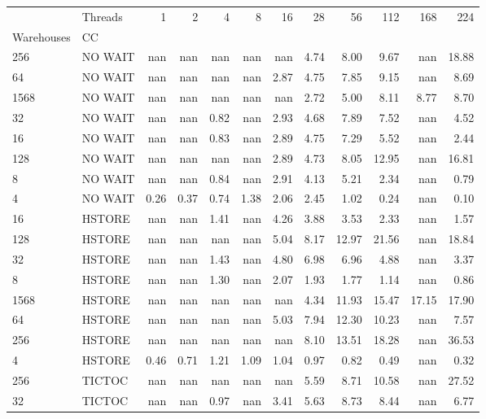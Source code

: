 \begin{tabular}{llrrrrrrrrrr}
\toprule
     & Threads &  1   &  2   &  4   &  8   &  16  &  28  &   56  &   112 &   168 &   224 \\
Warehouses & CC &      &      &      &      &      &      &       &       &       &       \\
\midrule
256  & NO WAIT &  nan &  nan &  nan &  nan &  nan & 4.74 &  8.00 &  9.67 &   nan & 18.88 \\
64   & NO WAIT &  nan &  nan &  nan &  nan & 2.87 & 4.75 &  7.85 &  9.15 &   nan &  8.69 \\
1568 & NO WAIT &  nan &  nan &  nan &  nan &  nan & 2.72 &  5.00 &  8.11 &  8.77 &  8.70 \\
32   & NO WAIT &  nan &  nan & 0.82 &  nan & 2.93 & 4.68 &  7.89 &  7.52 &   nan &  4.52 \\
16   & NO WAIT &  nan &  nan & 0.83 &  nan & 2.89 & 4.75 &  7.29 &  5.52 &   nan &  2.44 \\
128  & NO WAIT &  nan &  nan &  nan &  nan & 2.89 & 4.73 &  8.05 & 12.95 &   nan & 16.81 \\
8    & NO WAIT &  nan &  nan & 0.84 &  nan & 2.91 & 4.13 &  5.21 &  2.34 &   nan &  0.79 \\
4    & NO WAIT & 0.26 & 0.37 & 0.74 & 1.38 & 2.06 & 2.45 &  1.02 &  0.24 &   nan &  0.10 \\
16   & HSTORE &  nan &  nan & 1.41 &  nan & 4.26 & 3.88 &  3.53 &  2.33 &   nan &  1.57 \\
128  & HSTORE &  nan &  nan &  nan &  nan & 5.04 & 8.17 & 12.97 & 21.56 &   nan & 18.84 \\
32   & HSTORE &  nan &  nan & 1.43 &  nan & 4.80 & 6.98 &  6.96 &  4.88 &   nan &  3.37 \\
8    & HSTORE &  nan &  nan & 1.30 &  nan & 2.07 & 1.93 &  1.77 &  1.14 &   nan &  0.86 \\
1568 & HSTORE &  nan &  nan &  nan &  nan &  nan & 4.34 & 11.93 & 15.47 & 17.15 & 17.90 \\
64   & HSTORE &  nan &  nan &  nan &  nan & 5.03 & 7.94 & 12.30 & 10.23 &   nan &  7.57 \\
256  & HSTORE &  nan &  nan &  nan &  nan &  nan & 8.10 & 13.51 & 18.28 &   nan & 36.53 \\
4    & HSTORE & 0.46 & 0.71 & 1.21 & 1.09 & 1.04 & 0.97 &  0.82 &  0.49 &   nan &  0.32 \\
256  & TICTOC &  nan &  nan &  nan &  nan &  nan & 5.59 &  8.71 & 10.58 &   nan & 27.52 \\
32   & TICTOC &  nan &  nan & 0.97 &  nan & 3.41 & 5.63 &  8.73 &  8.44 &   nan &  6.77 \\

\end{tabular}

